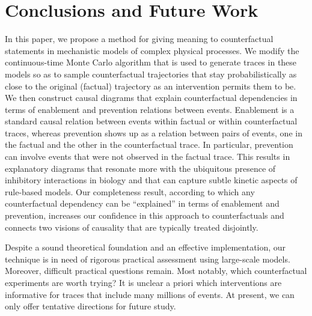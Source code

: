 
\section*{Conclusions and Future Work}

In this paper, we propose a method for giving meaning to
counterfactual statements in mechanistic models of
complex physical processes.  We modify the continuous-time Monte Carlo
algorithm that is used to generate traces in these models so as to
sample counterfactual trajectories that stay probabilistically as
close to the original (factual) trajectory as an intervention permits
them to be. We then construct causal diagrams that explain
counterfactual dependencies in terms of enablement and prevention
relations between events. Enablement is a standard causal relation
between events within factual or within counterfactual traces, whereas
prevention shows up as a relation between pairs of events, one in the
factual and the other in the counterfactual trace. In particular,
prevention can involve events that were not observed in the factual
trace. This results in explanatory diagrams that resonate more with
the ubiquitous presence of inhibitory interactions in biology and that
can capture subtle kinetic aspects of rule-based models.  Our
completeness result, according to which any counterfactual dependency
can be ``explained'' in terms of enablement and prevention, increases
our confidence in this approach to counterfactuals and connects two
visions of causality that are typically treated disjointly.

Despite a sound theoretical foundation and an effective
implementation, our technique is in need of rigorous practical
assessment using large-scale models. Moreover, difficult practical
questions remain. Most notably, which counterfactual experiments are
worth trying? It is unclear a priori which interventions are
informative for traces that include many millions of events. At
present, we can only offer tentative directions for future study.


